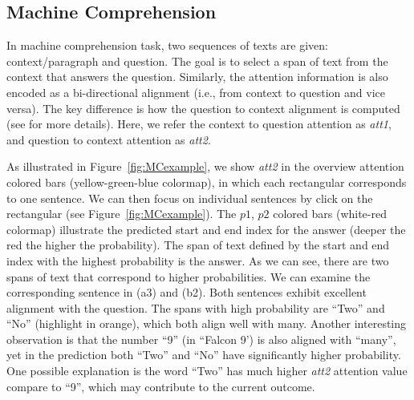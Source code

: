 \subsection{Machine Comprehension}
\label{sec:MCexample}
In machine comprehension task, two sequences of texts are given: context/paragraph and question.
The goal is to select a span of text from the context that answers the question. 
Similarly, the attention information is also encoded as a bi-directional alignment (i.e., from context to question and vice versa). 
The key difference is how the question to context alignment is computed (see \cite{Seo2016} for more details).
Here, we refer the context to question attention as \emph{att1}, and question to context attention as \emph{att2}.

As illustrated in Figure~\ref{fig:MCexample}, we show \emph{att2} in the overview attention colored bars (yellow-green-blue colormap), in which each rectangular corresponds to one sentence. We can then focus on individual sentences by click on the rectangular (see Figure~\ref{fig:MCexample}).
The $p1$, $p2$ colored bars (white-red colormap) illustrate the predicted start and end index for the answer (deeper the red the higher the probability). The span of text defined by the start and end index with the highest probability is the answer.
%
As we can see, there are two spans of text that correspond to higher probabilities. We can examine the corresponding sentence in (a3) and (b2). Both sentences exhibit excellent alignment with the question. The spans with high probability are ``Two'' and ``No'' (highlight in orange), which both align well with many.
Another interesting observation is that the number ``9'' (in ``Falcon 9') is also aligned with ``many'', yet in the prediction both ``Two'' and ``No'' have significantly higher probability.
One possible explanation is the word ``Two'' has much higher \emph{att2} attention value compare to ``9'', which may contribute to the current outcome.
